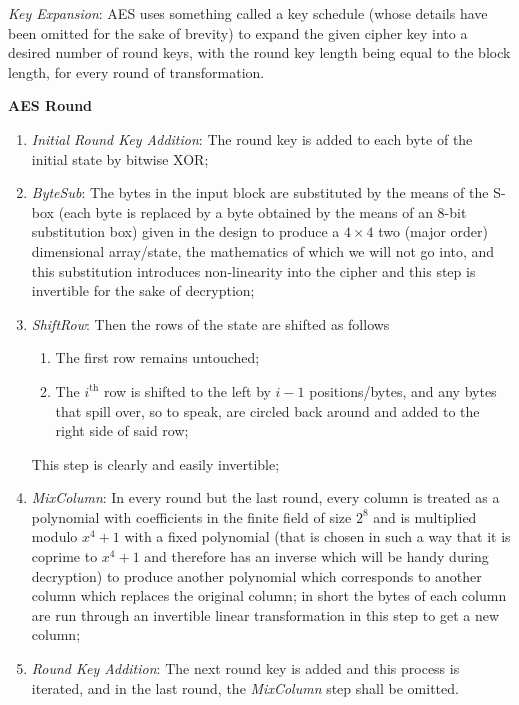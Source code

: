 \emph{Key Expansion}: AES uses something called a key schedule (whose details have been omitted for the sake of brevity) to expand the given cipher key into a desired number of round keys, with the round key length being equal to the block length, for every round of transformation.

\begin{center}
    \textbf{AES Round}
\end{center}

\begin{enumerate}
    \setlength\itemsep{1em}
    \item \emph{Initial Round Key Addition}: The round key is added to each byte of the initial state by bitwise XOR;
    \item \emph{ByteSub}: The bytes in the input block are substituted by the means of the S-box (each byte is replaced by a byte obtained by the means of an $8$-bit substitution box) given in the design to produce a $4\times 4$ two (major order) dimensional array/state, the mathematics of which we will not go into, and this substitution introduces non-linearity into the cipher and this step is invertible for the sake of decryption;
    \item \emph{ShiftRow}: Then the rows of the state are shifted as follows

    \begin{enumerate}
        \item The first row remains untouched;
        \item The $i^\text{th}$ row is shifted to the left by $i-1$ positions/bytes, and any bytes that spill over, so to speak, are circled back around and added to the right side of said row;
    \end{enumerate}

    This step is clearly and easily invertible;
\item \emph{MixColumn}: In every round but the last round, every column is treated as a polynomial with coefficients in the finite field of size $2^8$ and is multiplied modulo $x^4+1$ with a fixed polynomial (that is chosen in such a way that it is coprime to $x^4+1$ and therefore has an inverse which will be handy during decryption) to produce another polynomial which corresponds to another column which replaces the original column; 
    in short the bytes of each column are run through an invertible linear transformation in this step to get a new column;
\item \emph{Round Key Addition}: The next round key is added and this process is iterated, and in the last round, the \emph{MixColumn} step shall be omitted.
\end{enumerate}

